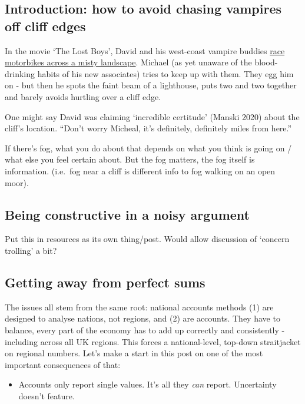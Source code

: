 \documentclass[
  letterpaper,
  DIV=11,
  numbers=noendperiod]{scrartcl}
\providecommand{\tightlist}{%
  \setlength{\itemsep}{0pt}\setlength{\parskip}{0pt}}
\begin{document}
\subsection{Introduction: how to avoid chasing vampires off cliff
edges}\label{introduction-how-to-avoid-chasing-vampires-off-cliff-edges}

In the movie `The Lost Boys', David and his west-coast vampire buddies
\href{https://youtu.be/DP_lSpeK69c?si=klxDzst0hVvV0QlY}{race motorbikes
across a misty landscape}. Michael (as yet unaware of the blood-drinking
habits of his new associates) tries to keep up with them. They egg him
on - but then he spots the faint beam of a lighthouse, puts two and two
together and barely avoids hurtling over a cliff edge.

One might say David was claiming `incredible certitude' (Manski 2020)
about the cliff's location. ``Don't worry Micheal, it's definitely,
definitely miles from here.''

If there's fog, what you do about that depends on what you think is
going on / what else you feel certain about. But the fog matters, the
fog itself is information. (i.e.~fog near a cliff is different info to
fog walking on an open moor).

\subsection{Being constructive in a noisy
argument}\label{being-constructive-in-a-noisy-argument}

Put this in resources as its own thing/post. Would allow discussion of
`concern trolling' a bit?

\subsection{Getting away from perfect
sums}\label{getting-away-from-perfect-sums}

The issues all stem from the same root: national accounts methods (1)
are designed to analyse nations, not regions, and (2) are accounts. They
have to balance, every part of the economy has to add up correctly and
consistently - including across all UK regions. This forces a
national-level, top-down straitjacket on regional numbers. Let's make a
start in this post on one of the most important consequences of that:

\begin{itemize}
\tightlist
\item
  Accounts only report single values. It's all they \emph{can} report.
  Uncertainty doesn't feature.
\end{itemize}
\end{document}
